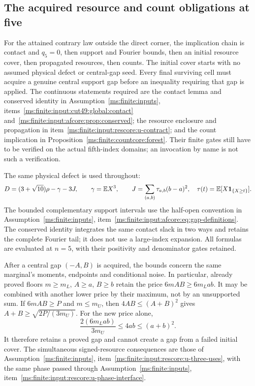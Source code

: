 \subsection{The acquired resource and count obligations at five}
\label{ms:finite:five:sec:acquired}

For the attained contrary law outside the direct corner, the implication
chain is contact and $q_5=0$, then support and Fourier bounds, then an
initial resource cover, then propagated resources, then counts.
The initial cover starts with no assumed physical defect or central-gap
seed. Every final surviving cell must acquire a genuine central support
gap before an inequality requiring that gap is applied.
The continuous statements required are the contact lemma and conserved identity
in Assumption~\ref{ms:finite:inputs}, items~\ref{ms:finite:input:cut49:global:contact}
and~\ref{ms:finite:input:afcore:prop:conserved}; the resource enclosure and
propagation in item~\ref{ms:finite:input:rescore:u-contract}; and the count
implication in Proposition~\ref{ms:finite:countcore:forest}. Their finite gates still have to be verified
on the actual fifth-index domains; an invocation by name is not such a
verification.

The same physical defect is used throughout:
\[
 D=(3+\sqrt{10})\rho-\gamma-3J,\qquad
 \gamma=\mathbb E X^3,\qquad J=\sum_{(a,b)}\tau_{a,b}(b-a)^2,
 \quad \tau(t)=\mathbb E[X\mathbf 1_{\{X\ge t\}}].
\]
The bounded complementary support intervals use the half-open convention
in Assumption~\ref{ms:finite:inputs}, item~\ref{ms:finite:input:afcore:eq:gap-definitions}. The conserved identity integrates
the same contact slack in two ways and retains the complete Fourier tail;
it does not use a large-index expansion. All formulas are evaluated at
$n=5$, with their positivity and denominator gates retained.

After a central gap $(-A,B)$ is acquired, the bounds concern the same
marginal's moments, endpoints and conditional noise. In particular,
already proved floors $m\ge m_L$, $A\ge a$, $B\ge b$ retain the price
$6mAB\ge6m_Lab$. It may be combined with another lower price by their
maximum, not by an unsupported sum. If $6mAB\ge P$ and $m\le m_U$,
then $4AB\le(A+B)^2$ gives $A+B\ge\sqrt{2P/(3m_U)}$.
For the new price alone,
\[
 \frac{2(6m_Lab)}{3m_U}\le4ab\le(a+b)^2.
\]
It therefore retains a proved gap and cannot create a gap from a failed
initial cover. The simultaneous signed-resource consequences are those
of Assumption~\ref{ms:finite:inputs}, item~\ref{ms:finite:input:rescore:u-three-uses}, with the same phase passed through
Assumption~\ref{ms:finite:inputs}, item~\ref{ms:finite:input:rescore:u-phase-interface}.

